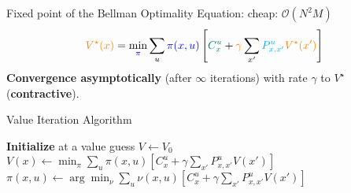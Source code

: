\begin{tcolorbox}[colframe=purple!50!black, colback=purple!5!white, title=Value Iteration]
Fixed point of the Bellman Optimality Equation: cheap: $\mathcal{O}(N^2M)$
\[
\textcolor{orange}{V^\star(x)} = \min_{\textcolor{blue}{\pi}} \sum_{u} \textcolor{blue}{\pi(x, u)} \left[ {\color{teal}C^u_x} + {\color{orange}\gamma} \sum_{x'} {\color{cyan}P^u_{x,x'}} \textcolor{orange}{V^\star(x')} \right]
\]
\textbf{Convergence asymptotically} (after $\infty$ iterations) with rate $\gamma$ to $V^\star$ (\textbf{contractive}).
\end{tcolorbox}

\begin{algorithm}[H]
\caption{Value Iteration Algorithm}
\begin{algorithmic}[1]
    \State \textbf{Initialize} at a value guess $V \gets V_0$
    \State $V(x) \gets \min_{\pi} \sum_{u} \pi(x, u) \left[ C^u_x + \gamma \sum_{x'} P^u_{x,x'} V(x') \right]$ 
    \EndFor
    \State $\pi(x, u) \gets \arg \min_{\nu} \sum_{u} \nu(x, u) \left[ C^u_x + \gamma \sum_{x'} P^u_{x,x'} V(x') \right]$ 
    \EndIf
\end{algorithmic}
\end{algorithm}

\newpage


